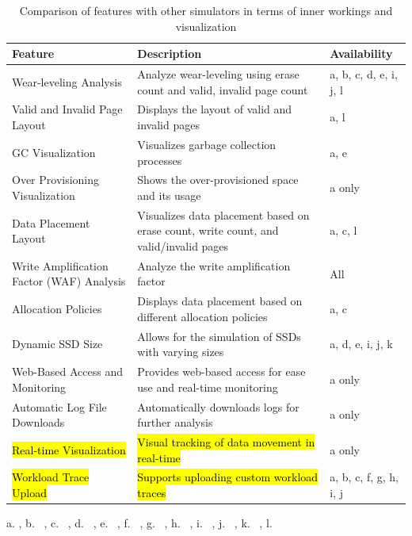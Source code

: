 \documentclass{ieeeaccess}
\begin{document}
\begin{table}
    \centering
    \caption{Comparison of \eyanassdsim features with other simulators in terms of inner workings and visualization}
    \label{table:features}
    \begin{tabular}{|p{2cm}|p{4cm}|p{1.5cm}|}
        \hline
        \textbf{Feature} & \textbf{Description} & \textbf{Availability} \\
        \hline
        Wear-leveling Analysis & Analyze wear-leveling using erase count and valid, invalid page count & a, b, c, d, e, i, j, l   \\
        \hline
        Valid and Invalid Page Layout & Displays the layout of valid and invalid pages & a, l \\
        \hline
        GC Visualization & Visualizes garbage collection processes & a, e \\
        \hline
        Over Provisioning Visualization & Shows the over-provisioned space and its usage & a only \\
        \hline
        Data Placement Layout & Visualizes data placement based on erase count, write count, and valid/invalid pages & a, c, l  \\
        \hline
        Write Amplification Factor (WAF) Analysis & Analyze the write amplification factor & All \\
        \hline
        Allocation Policies & Displays data placement based on different allocation policies & a, c \\
        \hline
        Dynamic SSD Size & Allows for the simulation of SSDs with varying sizes & a, d, e, i, j, k \\
        \hline
        Web-Based Access and Monitoring & Provides web-based access for ease use and real-time monitoring & a only \\
        \hline
        Automatic Log File Downloads & Automatically downloads logs for further analysis & a only \\
        \hline
        \hl{Real-time Visualization} & \hl{Visual tracking of data movement in real-time} & a only \\
        \hline
        \hl{Workload Trace Upload} & \hl{Supports uploading custom workload traces} & a, b, c, f, g, h, i, j \\
        \hline
    \end{tabular}

a. \eyanassdsim,
b. \mqsim~\cite{MQSim-USENIX18},
c. \ssdmodel~\cite{SSDModel-USENIX-TC-08},
d. \ssdsim~\cite{SSDSim-ICS-11},
e. \nandflashsim~\cite{NANDFlashSim-TOS-16},
f. \vssim~\cite{VSSIM-MSST-13},
g. \wiscsim~\cite{WiscSim-EuroSys-17},
h. \simplessd~\cite{SimpleSSD-IEEE18},
i. \femu~\cite{FEMU-FAST-18},
j. \ftlsim~\cite{FTLSim-ACM-2017},
k. \flashsim~\cite{FlashSim-FICASS-09},
l. \ssdplayer~\cite{SSDPlayer-HotStorage-15}
\end{table}
\end{document}
